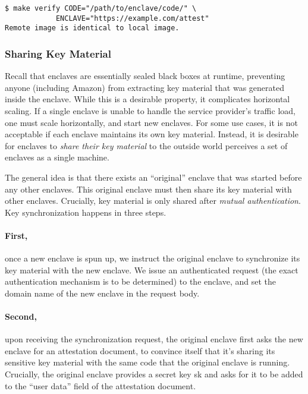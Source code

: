 \begin{lstlisting}
$ make verify CODE="/path/to/enclave/code/" \
            ENCLAVE="https://example.com/attest"
Remote image is identical to local image.
\end{lstlisting}

\subsubsection{Sharing Key Material}
\label{sec:sync}

Recall that enclaves are essentially sealed black boxes at runtime, preventing anyone (including Amazon) from extracting key material that was generated inside the enclave.  While this is a desirable property, it complicates horizontal scaling.  If a single enclave is unable to handle the service provider's traffic load, one must scale horizontally, and start new enclaves.  For some use cases, it is not acceptable if each enclave maintains its own key material.  Instead, it is desirable for enclaves to \emph{share their key material} to the outside world perceives a set of enclaves as a single machine.

The general idea is that there exists an ``original'' enclave that was started before any other enclaves. This original enclave must then share its key material with other enclaves.  Crucially, key material is only shared after \emph{mutual authentication}.  Key synchronization happens in three steps.


\paragraph{First,} once a new enclave is spun up, we instruct the original enclave to synchronize its key material with the new enclave. We issue an authenticated request (the exact authentication mechanism is to be determined) to the enclave, and set the domain name of the new enclave in the request body.

\paragraph{Second,} upon receiving the synchronization request, the original enclave first asks the new enclave for an attestation document, to convince itself that it’s sharing its sensitive key material with the same code that the original enclave is running. Crucially, the original enclave provides a secret key sk and asks for it to be added to the “user data” field of the attestation document.

